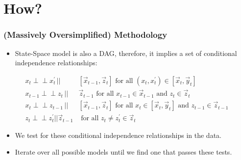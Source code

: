 \documentclass{beamer}
\def\indep{\perp \!\!\! \perp}
\begin{document}
\section{How?}

\begin{frame}
    \frametitle{(Massively Oversimplified) Methodology}
    \begin{itemize}
        \item State-Space model is also a DAG, therefore, it implies a set of conditional independence relationships:
    \end{itemize}
    \begin{align}
        x_t \indep x^{\prime}_{t} \,||\,& [\vec{x}_{t-1},\vec{z}_t] \text{ for all } (x_t, x^{\prime}_{t}) \in [\vec{x}_t, \vec{y}_t] \label{constraint_test:1} \\
        x_{t-1} \indep z_{t} \,||\,& \vec{z}_{t-1} \text{ for all } x_{t-1} \in \vec{x}_{t-1} \text{ and } z_{t} \in \vec{z}_t \label{constraint_test:3} \\
        x_t \indep z_{t-1} \,||\,& [\vec{x}_{t-1}, \vec{z}_t] \text{ for all } x_t \in [\vec{x}_t, \vec{y}_t] \text{ and } z_{t-1} \in \vec{z}_{t-1} \label{constraint_test:2} \\
        z_t \indep z^{\prime}_{t} || \vec{z}_{t-1} & \text{ for all } z_t \not = z^{\prime}_{t} \in \vec{z}_t \label{constraint_test:4}
    \end{align}
    \begin{itemize}
        \item We test for these conditional independence relationships in the data.
        \item Iterate over all possible models until we find one that passes these tests.
    \end{itemize}
\end{frame}
\end{document}
